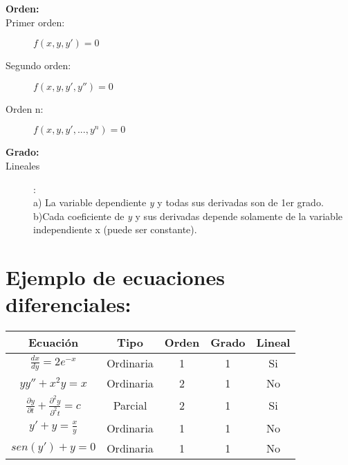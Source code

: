 \documentclass{article}
\begin{document}
\begin{description}
    \item[\textbf{Orden:}]
    \item[Primer orden:]\begin{center}$f(x,y,y') = 0$\end{center}
    \item[Segundo orden:]\begin{center}$f(x,y,y',y'') = 0$\end{center}
    \item[Orden n:]\begin{center}$f(x,y,y',...,y^n) = 0$\end{center}
\end{description}
    
\begin{description}
    \item[\textbf{Grado:}]
    \item[Lineales]:\\a) La variable dependiente \emph{y} y todas sus derivadas son de 1er grado.\\
    b)Cada coeficiente de \emph{y} y sus derivadas depende solamente de la variable independiente x (puede ser constante).
\end{description}

\section{Ejemplo de ecuaciones diferenciales:}
\begin{center}
\begin{tabular}{|c|c|c|c|c|}
\hline
Ecuación & Tipo & Orden & Grado & Lineal \\
\hline
$\frac{dx}{dy} = 2e^{-x} $ & Ordinaria & 1 & 1& Si\\
\hline
$yy''+ x^2y = x$ & Ordinaria & 2 & 1& No\\
\hline
$\frac{\partial y}{\partial t} + \frac{\partial^2 y}{\partial^2 t} = c$ & Parcial & 2 & 1& Si\\
\hline
$y'+ y = \frac{x}{y} $ & Ordinaria & 1 & 1& No\\
\hline
$sen(y')+ y = 0 $ & Ordinaria & 1 & 1& No\\
\hline
\end{tabular}
\end{center}

\printbibliography
\end{document}
